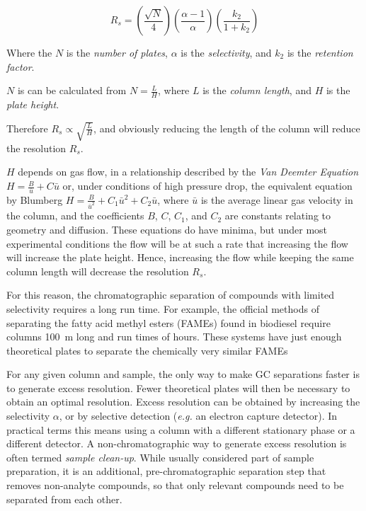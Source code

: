 \[ R_s = \left(\frac{\sqrt{N}}{4}\right)\left(\frac{\alpha-1}{\alpha}\right)\left(\frac{k_2}{1+k_2}\right) \]

Where the \(N\) is the \textit{number of plates}, \(\alpha\) is the
\textit{selectivity}, and \(k_2\) is the \textit{retention factor}.

\(N\) is can be calculated from \(N = \frac{L}{H} \), where \(L\) is the
\textit{column length}, and \(H\) is the \textit{plate height}.

Therefore \( R_s \propto \sqrt{\frac{L}{H}} \), and obviously reducing the
length of the column will reduce the resolution \(R_s\). 

\( H \) depends on gas flow, in a relationship described by the \textit{Van
Deemter Equation} \( H = \frac{B}{\bar{u}} + {C}{\bar{u}} \) or, under
conditions of high pressure drop, the equivalent equation by Blumberg
\autocite{Blumberg1997} \( H = \frac{B}{\bar{u}^2} + C_1\bar{u}^2 +
C_2\bar{u}\), where \(\bar{u}\) is the average linear gas velocity in the
column, and the coefficients \(B\), \(C\), \(C_1\), and \(C_2\) are constants
relating to geometry and diffusion.
These equations do have minima, but under most experimental conditions the flow
will be at such a rate that increasing the flow will increase the plate height.
Hence, increasing the flow while keeping the same column length will decrease
the resolution \( R_s \).


For this reason, the chromatographic separation of compounds with limited
selectivity requires a long run time. For example, the official methods of
separating the fatty acid methyl esters (FAMEs) found in biodiesel require
columns \SI{100}{\metre} long \autocite{AOCS2017} and run times of hours. These
systems have just enough theoretical plates to separate the chemically very
similar FAMEs

For any given column and sample, the only way to make GC separations faster is
to generate excess resolution. Fewer theoretical plates will then be necessary
to obtain an optimal resolution. Excess resolution can be obtained by increasing
the selectivity $\alpha$, or by selective detection (\textit{e.g.} an electron
capture detector). In practical terms this means using a column with a different
stationary phase or a different detector. A non-chromatographic way to generate
excess resolution is often termed \textit{sample clean-up}. While usually
considered part of sample preparation, it is an additional, pre-chromatographic
separation step that removes non-analyte compounds, so that only relevant
compounds need to be separated from each other.

